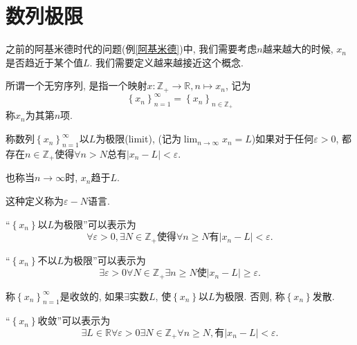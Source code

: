 
\section{数列极限}

之前的阿基米德时代的问题(例\ref{阿基米德})中, 我们需要考虑$n$越来越大的时候, $x_n$是否趋近于某个值$L$. 我们需要定义越来越接近这个概念.

\begin{definition}
    所谓一个无穷序列, 是指一个映射$x\colon \mathbb{Z}_{+} \to \mathbb{R}, n \mapsto x_n$, 记为
    \begin{equation}
      \left\{ x_n \right\} _{n=1}^{\infty} = \left\{ x_n \right\} _{n \in \mathbb{Z}_{+}}
    \end{equation}
    称$x_n$为其第$n$项.
\end{definition}

\begin{definition}
    称数列$\left\{ x_n \right\} _{n=1}^{\infty}$以$L$为极限(limit), (记为$\displaystyle \lim_{n \to \infty}x_n = L$)如果对于任何$\varepsilon> 0$, 都存在$n \in \mathbb{Z}_{+}$使得$\forall n>N$总有$|x_n - L| <\varepsilon$.

    也称当$n\to \infty$时, $x_n$趋于$L$.

    这种定义称为$\varepsilon - N$语言.
\end{definition}
``$\left\{ x_n \right\} $以$L$为极限''可以表示为
\begin{equation}
  \forall \varepsilon > 0 ,\exists N \in \mathbb{Z}_{+}\text{使得} \forall n\ge N \text{有} |x_n - L| < \varepsilon.
\end{equation}

``$\left\{ x_n \right\} $不以$L$为极限''可以表示为
\begin{equation}
  \exists \varepsilon>0  \forall N\in \mathbb{Z}_{+} \exists n \ge N \text{使}|x_n-L|\ge \varepsilon.
\end{equation}

\begin{definition}
    称$\left\{ x_n \right\} _{n=1}^{\infty}$是收敛的, 如果$\exists $实数$L$, 使$\left\{ x_n \right\} $以$L$为极限.
    否则, 称$\left\{ x_n \right\} $发散.
\end{definition}

``$\left\{ x_n \right\} $收敛''可以表示为
\begin{equation}
  \exists  L \in \mathbb{R} \forall \varepsilon >0 \exists N \in \mathbb{Z}_{+} \forall n \ge  N, \text{有} |x_n-L|<\varepsilon.
\end{equation}

